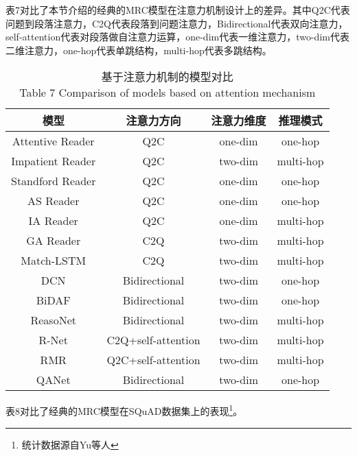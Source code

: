 表7对比了本节介绍的经典的MRC模型在注意力机制设计上的差异。其中Q2C代表问题到段落注意力，C2Q代表段落到问题注意力，Bidirectional代表双向注意力，self-attention代表对段落做自注意力运算，one-dim代表一维注意力，two-dim代表二维注意力，one-hop代表单跳结构，multi-hop代表多跳结构。
\begin{table}[ht]
	\centering
	\caption{基于注意力机制的模型对比 \\ Table 7 Comparison of models based on attention mechanism}
	\begin{tabular}{c c c c}
		\toprule
		模型&注意力方向&注意力维度&推理模式 \\
		\midrule
		Attentive Reader\upcite{Hermann}&Q2C&one-dim&one-hop \\
		\midrule
		Impatient Reader\upcite{Hermann}&Q2C&two-dim&multi-hop \\
		\midrule
		Standford Reader\upcite{AR}&Q2C&one-dim&one-hop \\
		\midrule
		AS Reader\upcite{ASR}&Q2C&one-dim&one-hop \\
		\midrule
		IA Reader\upcite{IAReader}&Q2C&one-dim&multi-hop \\
		\midrule
		GA Reader\upcite{GAReader}&C2Q&two-dim&multi-hop \\
		\midrule
		Match-LSTM\upcite{MatchLSTM}&C2Q&two-dim&multi-hop \\
		\midrule
		DCN\upcite{DCN}&Bidirectional&two-dim&one-hop \\           
		\midrule
		BiDAF\upcite{BiDAF}&Bidirectional&two-dim&one-hop \\
		\midrule
		ReasoNet\upcite{Reasonet}&Bidirectional&two-dim&multi-hop\\
		\midrule
		R-Net\upcite{RNet}&C2Q+self-attention&two-dim&multi-hop \\
		\midrule
		RMR\upcite{RMR}&Q2C+self-attention&two-dim&multi-hop \\
		\midrule
		QANet\upcite{QANet}&Bidirectional&two-dim&one-hop\\
		\bottomrule
	\end{tabular}
\end{table}

表8对比了经典的MRC模型在SQuAD数据集上的表现\footnote{统计数据源自Yu等人}。


